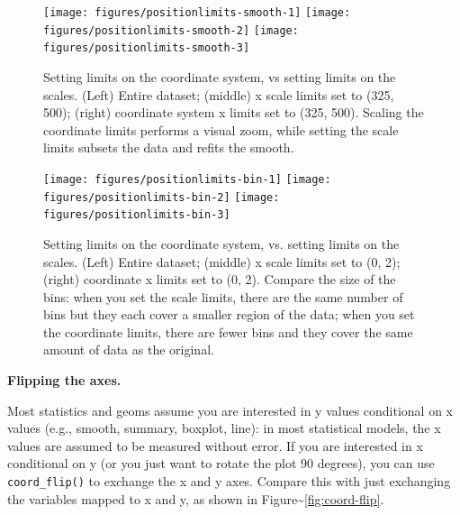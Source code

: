 \begin{figure}
\texttt{[image: figures/positionlimits-smooth-1]} \texttt{[image: figures/positionlimits-smooth-2]} \texttt{[image: figures/positionlimits-smooth-3]} \caption{Setting limits on the coordinate system, vs setting limits on the scales.  (Left) Entire dataset; (middle) x scale limits set to (325, 500); (right) coordinate system x limits set to (325, 500).  Scaling the coordinate limits performs a visual zoom, while setting the scale limits subsets the data and refits the smooth.\label{fig:limits-smooth}}
\end{figure}

\begin{Shaded}
\begin{Highlighting}[]
\StringTok{ }\StringTok{ }
\StringTok{  }\NormalTok{(} \NormalTok{, }\NormalTok{) +}\StringTok{ }
\StringTok{  }\NormalTok{(} \NormalTok{)) }
\StringTok{ }\NormalTok{(} \NormalTok{(}\NormalTok{, }\NormalTok{))}
\StringTok{ }\NormalTok{(} \NormalTok{(}\NormalTok{, }\NormalTok{))}
\end{Highlighting}
\end{Shaded}

\begin{figure}
\texttt{[image: figures/positionlimits-bin-1]} \texttt{[image: figures/positionlimits-bin-2]} \texttt{[image: figures/positionlimits-bin-3]} \caption{Setting limits on the coordinate system, vs. setting limits on the scales.  (Left) Entire dataset; (middle) x scale limits set to (0, 2); (right) coordinate x limits set to (0, 2).  Compare the size of the bins: when you set the scale limits, there are the same number of bins but they each cover a smaller region of the data; when you set the coordinate limits, there are fewer bins and they cover the same amount of data as the original.\label{fig:limits-bin}}
\end{figure}

\textbf{Flipping the axes.}

Most statistics and geoms assume you are interested in y values
conditional on x values (e.g., smooth, summary, boxplot, line): in most
statistical models, the x values are assumed to be measured without
error. If you are interested in x conditional on y (or you just want to
rotate the plot 90 degrees), you can use \texttt{coord\_flip()} to
exchange the x and y axes. Compare this with just exchanging the
variables mapped to x and y, as shown in
Figure\textasciitilde{}\ref{fig:coord-flip}. 
 

